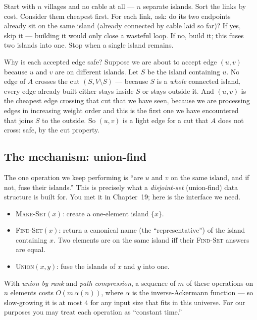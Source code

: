 \begin{intuitionbox}
Start with $n$ villages and no cable at all --- $n$ separate islands. Sort the
links by cost. Consider them cheapest first. For each link, ask: do its two
endpoints already sit on the same island (already connected by cable laid so
far)? If yes, skip it --- building it would only close a wasteful loop. If no,
build it; this fuses two islands into one. Stop when a single island remains.
\end{intuitionbox}

Why is each accepted edge safe? Suppose we are about to accept edge $(u,v)$
because $u$ and $v$ are on different islands. Let $S$ be the island containing
$u$. No edge of $A$ crosses the cut $(S, V\setminus S)$ --- because $S$ is a
\emph{whole} connected island, every edge already built either stays inside $S$
or stays outside it. And $(u,v)$ is the cheapest edge crossing that cut that we
have seen, because we are processing edges in increasing weight order and this is
the first one we have encountered that joins $S$ to the outside. So $(u,v)$ is a
light edge for a cut that $A$ does not cross: safe, by the cut property.

\subsection{The mechanism: union-find}

The one operation we keep performing is ``are $u$ and $v$ on the same island,
and if not, fuse their islands.'' This is precisely what a \emph{disjoint-set}
(union-find) data structure is built for. You met it in Chapter~19; here is the
interface we need.

\begin{itemize}
\item \textsc{Make-Set}$(x)$: create a one-element island $\{x\}$.
\item \textsc{Find-Set}$(x)$: return a canonical name (the ``representative'') of
  the island containing $x$. Two elements are on the same island iff their
  \textsc{Find-Set} answers are equal.
\item \textsc{Union}$(x,y)$: fuse the islands of $x$ and $y$ into one.
\end{itemize}

With \emph{union by rank} and \emph{path compression}, a sequence of $m$ of these
operations on $n$ elements costs $O(m\,\alpha(n))$, where $\alpha$ is the
inverse-Ackermann function --- so slow-growing it is at most $4$ for any input
size that fits in this universe. For our purposes you may treat each operation as
``constant time.''


